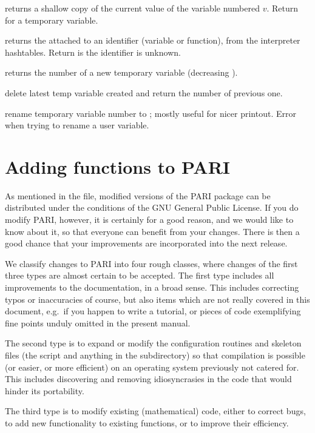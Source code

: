  returns a shallow copy of the
current value of the variable numbered $v$. Return  for a temporary
variable.

 returns the  attached
to an identifier  (variable or function), from the interpreter
hashtables. Return  is the identifier is unknown.


 returns the number of a new temporary variable
(decreasing ).

 delete latest temp variable created and return
the number of previous one.

 rename temporary variable number
 to ; mostly useful for nicer printout. Error when trying to
rename a user variable.

\section{Adding functions to PARI}
%
As mentioned in the  file, modified versions of the PARI package
can be distributed under the conditions of the GNU General Public License. If
you do modify PARI, however, it is certainly for a good reason, and we
would like to know about it, so that everyone can benefit from your changes.
There is then a good chance that your improvements are incorporated into the
next release.

We classify changes to PARI into four rough classes, where changes of the
first three types are almost certain to be accepted. The first type includes
all improvements to the documentation, in a broad sense. This includes
correcting typos or inaccuracies of course, but also items which are not
really covered in this document, e.g.~if you happen to write a tutorial,
or pieces of code exemplifying fine points unduly omitted in the present
manual.

The second type is to expand or modify the configuration routines and skeleton
files (the  script and anything in the 
subdirectory) so that compilation is possible (or easier, or more efficient)
on an operating system previously not catered for. This includes discovering
and removing idiosyncrasies in the code that would hinder its portability.

The third type is to modify existing (mathematical) code, either to correct
bugs, to add new functionality to existing functions, or to improve their
efficiency.

